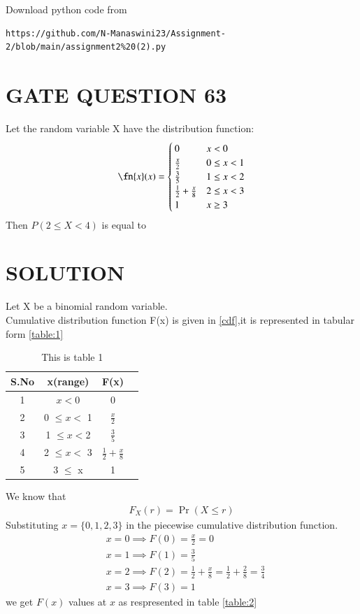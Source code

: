 \documentclass[journal,12pt,twocolumn]{IEEEtran}
\begin{document}
\renewcommand{\thefigure}{\theenumi}
\renewcommand{\thetable}{\theenumi}
Download python code from 
\begin{lstlisting}
https://github.com/N-Manaswini23/Assignment-2/blob/main/assignment2%20(2).py
\end{lstlisting}
%

\section*{GATE QUESTION 63}
Let the random variable X have the distribution function:
\begin{align}
\fn{x}  (x) = \begin{cases}
0 & x < 0
\\
\frac{x}{2} & 0 \leq x < 1 
\\
\frac{3}{5} & 1 \leq x < 2
\\
\frac{1}{2}+\frac{x}{8} & 2 \leq x < 3
\\
1 & x \geq 3
\end{cases} \label{cdf}
\end{align}
Then $P (2 \leq X < 4)$ is equal to


\section*{SOLUTION}
Let X be a binomial random variable. \\
Cumulative distribution function F(x) is given in \eqref{cdf},it is represented in tabular form \eqref{table:1}


\begin{table}[h!]
\resizebox{7cm}{!}
{ 
\begin{tabular}{|c|c|c|c|}
\hline
S.No & x(range) & F(x) \\
\hline
1 & $x < 0$ & 0 \\
\hline
2 & 0 $\leq x < $ 1 & $\frac{x}{2}$\\
\hline
3 & 1 $\leq  x < $2 & $\frac{3}{5}$\\
\hline
4 & 2 $\leq x  < $ 3 & $\frac{1}{2}+\frac{x}{8}$  \\
\hline
5 & 3 $\leq$ x & 1\\
\hline
\end{tabular} 
}
\caption{This is table 1}
\label{table:1}
\end{table}
We know that
\begin{align}
F_X(r) = \Pr (X \leq r) 
\end{align}
Substituting $x=\{0,1,2,3\}$ in the piecewise cumulative distribution function.\\
\begin{align}
&x=0 \implies F(0)=\frac{x}{2}=0\\
&x=1 \implies F(1)=\frac{3}{5}\\
&x=2 \implies F(2)=\frac{1}{2}+\frac{x}{8}=\frac{1}{2}+\frac{2}{8}=\frac{3}{4}\\
&x=3 \implies F(3)=1 \label{1}
\end{align}
we get $F(x)$ values at $x$ as respresented in table \eqref{table:2}
\end{document}
